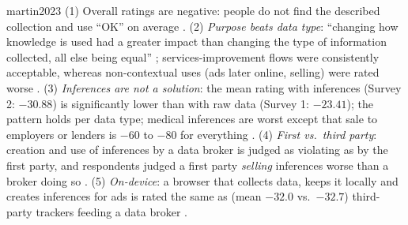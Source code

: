 \begin{papercard}{martin2023}
 (1) Overall ratings are negative: people do not find the described collection and use ``OK'' on average . (2) \emph{Purpose beats data type}: ``changing how knowledge is used had a greater impact than changing the type of information collected, all else being equal'' ; services-improvement flows were consistently acceptable, whereas non-contextual uses (ads later online, selling) were rated worse . (3) \emph{Inferences are not a solution}: the mean rating with inferences (Survey 2: $-30.88$) is significantly lower than with raw data (Survey 1: $-23.41$); the pattern holds per data type; medical inferences are worst except that sale to employers or lenders is $-60$ to $-80$ for everything . (4) \emph{First vs.\ third party}: creation and use of inferences by a data broker is judged as violating as by the first party, and respondents judged a first party \emph{selling} inferences worse than a broker doing so . (5) \emph{On-device}: a browser that collects data, keeps it locally and creates inferences for ads is rated the same as (mean $-32.0$ vs.\ $-32.7$) third-party trackers feeding a data broker .


\end{papercard}

